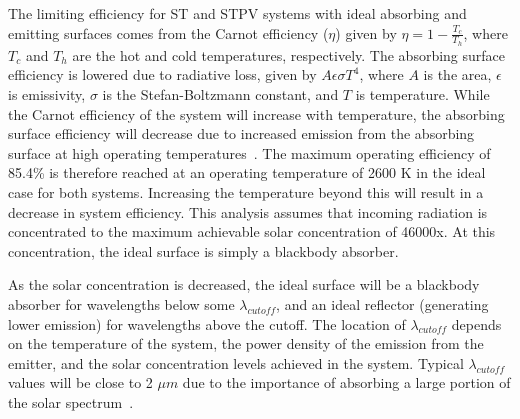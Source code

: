 \documentclass[10pt,letterpaper]{article}
\begin{document}
The limiting efficiency for ST and STPV systems with ideal absorbing and emitting surfaces comes from the Carnot efficiency ($\eta$) 
given by $\eta = 1 - \frac{T_c}{T_h}$, where $T_c$ and $T_h$ are the hot and cold temperatures, respectively. The absorbing 
surface efficiency is lowered due to radiative loss, 
given by $ A \epsilon \sigma T^4$, where $A$ is the area, $\epsilon$ is emissivity, $\sigma$ is the Stefan-Boltzmann constant, and $T$ is temperature.  
While the Carnot efficiency of the system will increase with temperature, the absorbing surface efficiency will decrease due to 
increased emission from the absorbing surface at high operating temperatures~\cite{L_AIP_2007}.  The maximum operating efficiency 
of 85.4\% is therefore reached at an operating temperature of 2600 K in the ideal case for both systems.  Increasing 
the temperature beyond this will result in a decrease in system efficiency.  This analysis assumes that incoming 
radiation is concentrated to the maximum achievable solar concentration of 46000x.  At this concentration, the 
ideal surface is simply a blackbody absorber.
 
As the solar concentration is decreased, the ideal surface will be a blackbody absorber for wavelengths below 
some $\lambda_{cutoff}$, and an ideal reflector (generating lower emission) for wavelengths above the cutoff.  The 
location of $\lambda_{cutoff}$
depends on the temperature of the system, the power density of the emission from the emitter, and the solar concentration 
levels achieved in the system.  Typical $\lambda_{cutoff}$ values will be close to 2 $\mu m$ due to the importance of absorbing a 
large portion of the solar spectrum~\cite{RF_OptExp_2009}.
 
\end{document}
